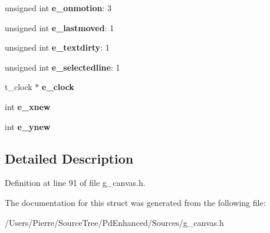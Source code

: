 \begin{DoxyCompactItemize}
\item 
\hypertarget{struct__editor_a109a93d361f1ab77d84de984fe5eaf63}{unsigned int {\bfseries e\-\_\-onmotion}\-: 3}\label{struct__editor_a109a93d361f1ab77d84de984fe5eaf63}

\item 
\hypertarget{struct__editor_a0f7f4b438bd140dc0d460e61e6c71349}{unsigned int {\bfseries e\-\_\-lastmoved}\-: 1}\label{struct__editor_a0f7f4b438bd140dc0d460e61e6c71349}

\item 
\hypertarget{struct__editor_a1325c088c54ccc69cd49c2320bdd984c}{unsigned int {\bfseries e\-\_\-textdirty}\-: 1}\label{struct__editor_a1325c088c54ccc69cd49c2320bdd984c}

\item 
\hypertarget{struct__editor_a4d9d722f540321af73f151e91671cf41}{unsigned int {\bfseries e\-\_\-selectedline}\-: 1}\label{struct__editor_a4d9d722f540321af73f151e91671cf41}

\item 
\hypertarget{struct__editor_a1402f37a68775c1ada846a5d788631a6}{t\-\_\-clock $\ast$ {\bfseries e\-\_\-clock}}\label{struct__editor_a1402f37a68775c1ada846a5d788631a6}

\item 
\hypertarget{struct__editor_a7afc5622e561d8c56f496b8aba07b413}{int {\bfseries e\-\_\-xnew}}\label{struct__editor_a7afc5622e561d8c56f496b8aba07b413}

\item 
\hypertarget{struct__editor_aca4d717a43838ac853e5f60ef72413c8}{int {\bfseries e\-\_\-ynew}}\label{struct__editor_aca4d717a43838ac853e5f60ef72413c8}

\end{DoxyCompactItemize}


\subsection{Detailed Description}


Definition at line 91 of file g\-\_\-canvas.\-h.



The documentation for this struct was generated from the following file\-:\begin{DoxyCompactItemize}
\item 
/\-Users/\-Pierre/\-Source\-Tree/\-Pd\-Enhanced/\-Sources/g\-\_\-canvas.\-h\end{DoxyCompactItemize}
